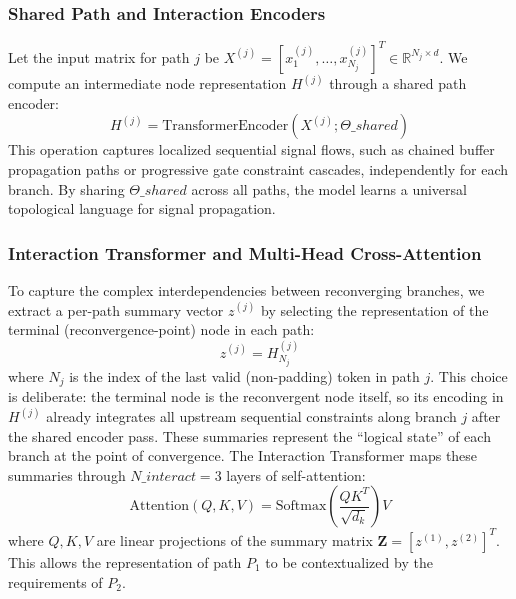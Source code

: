 \documentclass[conference]{IEEEtran}
\begin{document}
\subsubsection{Shared Path and Interaction Encoders}
Let the input matrix for path $j$ be $X^{(j)} = [x_1^{(j)}, \ldots, x_{N_j}^{(j)}]^T \in \mathbb{R}^{N_j \times d}$. We compute an intermediate node representation $H^{(j)}$ through a shared path encoder:
\begin{equation}
   H^{(j)} = \text{TransformerEncoder}(X^{(j)}; \Theta\_{shared})
\end{equation}
This operation captures localized sequential signal flows, such as chained buffer propagation paths or progressive gate constraint cascades, independently for each branch. By sharing $\Theta\_{shared}$ across all paths, the model learns a universal topological language for signal propagation.

\subsubsection{Interaction Transformer and Multi-Head Cross-Attention}
To capture the complex interdependencies between reconverging branches, we extract a per-path summary vector $z^{(j)}$ by selecting the representation of the terminal (reconvergence-point) node in each path:
\begin{equation}
   z^{(j)} = H^{(j)}_{N_j}
\end{equation}
where $N_j$ is the index of the last valid (non-padding) token in path $j$. This choice is deliberate: the terminal node is the reconvergent node itself, so its encoding in $H^{(j)}$ already integrates all upstream sequential constraints along branch $j$ after the shared encoder pass. These summaries represent the ``logical state'' of each branch at the point of convergence. The Interaction Transformer maps these summaries through $N\_{interact}=3$ layers of self-attention:
\begin{equation}
   \text{Attention}(Q, K, V) = \text{Softmax}\left(\frac{QK^T}{\sqrt{d_k}}\right)V
\end{equation}
where $Q, K, V$ are linear projections of the summary matrix $\mathbf{Z} = [z^{(1)}, z^{(2)}]^T$. This allows the representation of path $P_1$ to be contextualized by the requirements of $P_2$.
\end{document}
